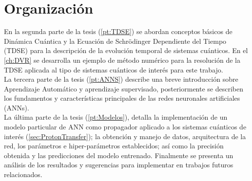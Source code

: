 \section{Organización}

En la segunda parte de la tesis (\autoref{pt:TDSE}) se abordan conceptos básicos de Dinámica Cuántica y la Ecuación de Schrödinger Dependiente del Tiempo (\acs{TDSE}) para la descripción de la evolución temporal de sistemas cuánticos. En el \autoref{ch:DVR} se desarrolla un ejemplo de método numérico para la resolución de la \acs{TDSE} aplicada al tipo de sistemas cuánticos de interés para este trabajo.\\

La tercera parte de la tesis (\autoref{pt:ANNS}) describe una breve introducción sobre Aprendizaje Automático y aprendizaje supervisado, posteriormente se describen los fundamentos y características principales de las redes neuronales artificiales (\acp{ANN}).\\

La última parte de la tesis (\autoref{pt:Modelos}), detalla la implementación de un modelo particular de \acs{ANN} como propagador aplicado a los sistemas cuánticos de interés (\autoref{sec:ProtonTransfer}); la obtención y manejo de datos, arquitectura de la red, los parámetros e hiper-parámetros establecidos; así como la precisión obtenida y las predicciones del modelo entrenado. Finalmente se presenta un análisis de los resultados y sugerencias para implementar en trabajos futuros relacionados.









